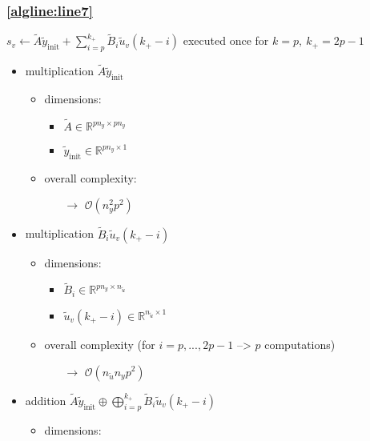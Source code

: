 \documentclass{article}
\begin{document}
\subsubsection{\cref{algline:line7}} 
$s_v \gets \tilde{A} \tilde{y}_\text{init} + \sum_{i=p}^{k_+} \tilde{B}_{i}\tilde{u}_v(k_+-i)$
executed once for $k=p,~k_+=2p-1$
\begin{itemize}
    \item multiplication $\tilde{A} \tilde{y}_\text{init}$
    \begin{itemize}
        \item dimensions:
        \begin{itemize}
            \item $\tilde{A} \in \mathbb{R}^{pn_y \times pn_y}$
            \item $\tilde{y}_\text{init} \in \mathbb{R}^{pn_y \times 1}$
        \end{itemize}
        \item overall complexity: %
        \begin{itemize}
            \item[$\rightarrow$] $\mathcal{O}(n_y^2 p^2)$
        \end{itemize}
    \end{itemize}
    \item multiplication $\tilde{B}_{i} \tilde{u}_v(k_+-i)$
    \begin{itemize}
        \item dimensions:
        \begin{itemize}
            \item $\tilde{B}_{i} \in \mathbb{R}^{pn_y \times n_{\tilde{u}}}$
            \item $\tilde{u}_v(k_+-i) \in \mathbb{R}^{n_{\tilde{u}} \times 1}$
        \end{itemize}
        \item overall complexity (for $i=p,...,2p-1$ --> $p$ computations)
        \begin{itemize}
            \item[$\rightarrow$] $\mathcal{O}(n_{\tilde{u}} n_y p^2)$
        \end{itemize}
    \end{itemize}
    \item addition $\tilde{A} \tilde{y}_\text{init} \oplus \bigoplus_{i=p}^{k_+} \tilde{B}_{i} \tilde{u}_v(k_+-i)$
    \begin{itemize}
        \item dimensions:

\end{itemize}
\end{itemize}
\end{document}
